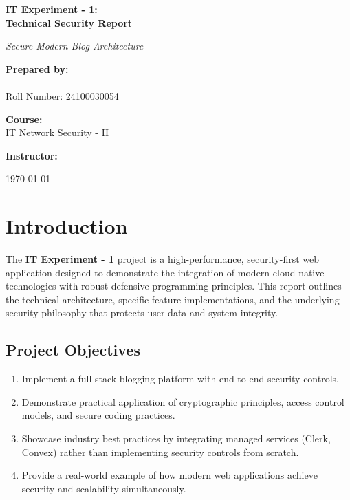 \documentclass[11pt,a4paper]{article}
\begin{document}
\begin{titlepage}
    \centering
    \vspace*{2cm}
    {\Huge\bfseries\color{primary} IT Experiment - 1: \\ Technical Security Report \par}
    \vspace{1cm}
    {\Large\itshape Secure Modern Blog Architecture \par}
    \vspace{2cm}
    \textbf{Prepared by:} \\
    [Sumit Kumar] \\
    Roll Number: 24100030054 \par
    \vspace{1cm}
    \textbf{Course:} \\
    IT Network Security  - II\par
    \vspace{1cm}
    \textbf{Instructor:} \\
    [Prof. Rohit Nanda] \par
    \vfill
    {\large \today \par}
\end{titlepage}

\newpage
\tableofcontents
\newpage

\section{Introduction}
The \textbf{IT Experiment - 1} project is a high-performance, security-first web application designed to demonstrate the integration of modern cloud-native technologies with robust defensive programming principles. This report outlines the technical architecture, specific feature implementations, and the underlying security philosophy that protects user data and system integrity.

\subsection{Project Objectives}
\begin{enumerate}
    \item Implement a full-stack blogging platform with end-to-end security controls.
    \item Demonstrate practical application of cryptographic principles, access control models, and secure coding practices.
    \item Showcase industry best practices by integrating managed services (Clerk, Convex) rather than implementing security controls from scratch.
    \item Provide a real-world example of how modern web applications achieve security and scalability simultaneously.
\end{enumerate}
\end{document}
